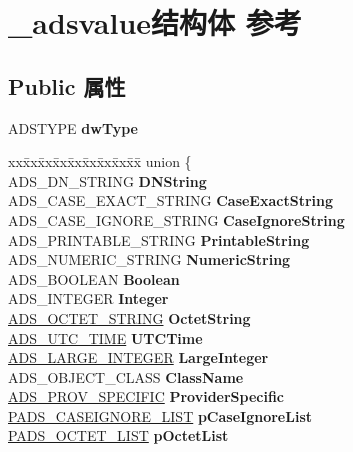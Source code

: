 \hypertarget{struct__adsvalue}{}\section{\+\_\+adsvalue结构体 参考}
\label{struct__adsvalue}
\subsection*{Public 属性}
\begin{DoxyCompactItemize}
\item 
\mbox{\label{struct__adsvalue_a3e0a877868df93bfae4bff0ebd17ef1e}} 
A\+D\+S\+T\+Y\+PE {\bfseries dw\+Type}
\item 
\mbox{\label{struct__adsvalue_ac0519015e89a7f8ff94867f8f3587f05}} 
\begin{tabbing}
xx\=xx\=xx\=xx\=xx\=xx\=xx\=xx\=xx\=\kill
union \{\\
\>ADS\_DN\_STRING {\bfseries DNString}\\
\>ADS\_CASE\_EXACT\_STRING {\bfseries CaseExactString}\\
\>ADS\_CASE\_IGNORE\_STRING {\bfseries CaseIgnoreString}\\
\>ADS\_PRINTABLE\_STRING {\bfseries PrintableString}\\
\>ADS\_NUMERIC\_STRING {\bfseries NumericString}\\
\>ADS\_BOOLEAN {\bfseries Boolean}\\
\>ADS\_INTEGER {\bfseries Integer}\\
\>\hyperlink{struct_a_d_s___o_c_t_e_t___s_t_r_i_n_g}{ADS\_OCTET\_STRING} {\bfseries OctetString}\\
\>\hyperlink{struct___s_y_s_t_e_m_t_i_m_e}{ADS\_UTC\_TIME} {\bfseries UTCTime}\\
\>\hyperlink{union___l_a_r_g_e___i_n_t_e_g_e_r}{ADS\_LARGE\_INTEGER} {\bfseries LargeInteger}\\
\>ADS\_OBJECT\_CLASS {\bfseries ClassName}\\
\>\hyperlink{struct_a_d_s___p_r_o_v___s_p_e_c_i_f_i_c}{ADS\_PROV\_SPECIFIC} {\bfseries ProviderSpecific}\\
\>\hyperlink{struct___a_d_s___c_a_s_e_i_g_n_o_r_e___l_i_s_t}{PADS\_CASEIGNORE\_LIST} {\bfseries pCaseIgnoreList}\\
\>\hyperlink{struct___a_d_s___o_c_t_e_t___l_i_s_t}{PADS\_OCTET\_LIST} {\bfseries pOctetList}\\

\end{tabbing}
\end{DoxyCompactItemize}
